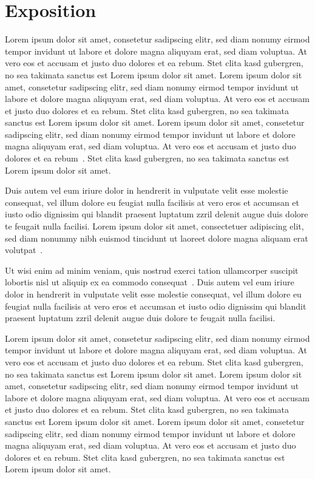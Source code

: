 \documentclass[journal]{vgtc}
\begin{document}
\section{Exposition}

Lorem ipsum dolor sit amet, consetetur sadipscing elitr, sed diam
nonumy eirmod tempor invidunt ut labore et dolore magna aliquyam erat,
sed diam voluptua. At vero eos et accusam et justo duo dolores et ea
rebum. Stet clita kasd gubergren, no sea takimata sanctus est Lorem
ipsum dolor sit amet. Lorem ipsum dolor sit amet, consetetur
sadipscing elitr, sed diam nonumy eirmod tempor invidunt ut labore et
dolore magna aliquyam erat, sed diam voluptua. At vero eos et accusam
et justo duo dolores et ea rebum. Stet clita kasd gubergren, no sea
takimata sanctus est Lorem ipsum dolor sit amet. Lorem ipsum dolor sit
amet, consetetur sadipscing elitr, sed diam nonumy eirmod tempor
invidunt ut labore et dolore magna aliquyam erat, sed diam
voluptua. At vero eos et accusam et justo duo dolores et ea
rebum~\cite{ware:2004:IVP}. Stet clita kasd gubergren, no sea takimata
sanctus est Lorem ipsum dolor sit amet.

Duis autem vel eum iriure dolor in hendrerit in vulputate velit esse
molestie consequat, vel illum dolore eu feugiat nulla facilisis at
vero eros et accumsan et iusto odio dignissim qui blandit praesent
luptatum zzril delenit augue duis dolore te feugait nulla
facilisi. Lorem ipsum dolor sit amet, consectetuer adipiscing elit,
sed diam nonummy nibh euismod tincidunt ut laoreet dolore magna
aliquam erat volutpat~\cite{kindlmann:1999:SAG}.

Ut wisi enim ad minim veniam, quis nostrud exerci tation ullamcorper
suscipit lobortis nisl ut aliquip ex ea commodo
consequat~\cite{levoy:1989:DSV}. Duis autem vel eum iriure dolor in
hendrerit in vulputate velit esse molestie consequat, vel illum dolore
eu feugiat nulla facilisis at vero eros et accumsan et iusto odio
dignissim qui blandit praesent luptatum zzril delenit augue duis
dolore te feugait nulla facilisi.

Lorem ipsum dolor sit amet, consetetur sadipscing elitr, sed diam
nonumy eirmod tempor invidunt ut labore et dolore magna aliquyam erat,
sed diam voluptua. At vero eos et accusam et justo duo dolores et ea
rebum. Stet clita kasd gubergren, no sea takimata sanctus est Lorem
ipsum dolor sit amet. Lorem ipsum dolor sit amet, consetetur
sadipscing elitr, sed diam nonumy eirmod tempor invidunt ut labore et
dolore magna aliquyam erat, sed diam voluptua. At vero eos et accusam
et justo duo dolores et ea rebum. Stet clita kasd gubergren, no sea
takimata sanctus est Lorem ipsum dolor sit amet. Lorem ipsum dolor sit
amet, consetetur sadipscing elitr, sed diam nonumy eirmod tempor
invidunt ut labore et dolore magna aliquyam erat, sed diam
voluptua. At vero eos et accusam et justo duo dolores et ea
rebum. Stet clita kasd gubergren, no sea takimata sanctus est Lorem
ipsum dolor sit amet.
\end{document}
